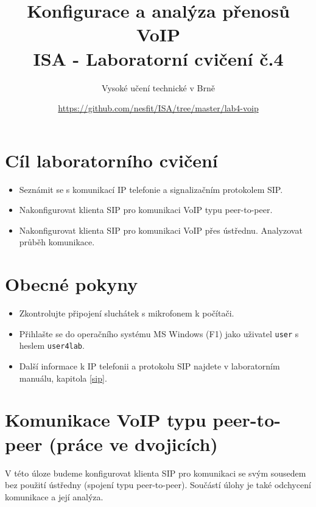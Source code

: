 \documentclass[a4paper,11pt]{article}
\title{Konfigurace a analýza přenosů VoIP\\
{\bf\large ISA - Laboratorní cvičení č.4}}
\author{Vysoké učení technické v Brně}
\date{\url{https://github.com/nesfit/ISA/tree/master/lab4-voip}}
\begin{document}
{\let\newpage\relax\maketitle}
\section*{Cíl laboratorního cvičení}
\begin{itemize}
  \item Seznámit se s komunikací IP telefonie a signalizačním protokolem SIP.
  \item Nakonfigurovat klienta SIP pro komunikaci VoIP typu peer-to-peer.
  \item Nakonfigurovat klienta SIP pro komunikaci VoIP přes ústřednu. Analyzovat průběh komunikace.
\end{itemize}

\section*{Obecné pokyny}
\begin{itemize}
  \item Zkontrolujte připojení sluchátek s mikrofonem k počítači. 
  \item Přihlašte se do operačního systému MS Windows (F1) jako uživatel {\tt user} s heslem {\tt user4lab}.
  \item Další informace k IP telefonii a protokolu SIP najdete v laboratorním manuálu, kapitola \ref{sip}. 
\end{itemize}

\section{Komunikace VoIP typu peer-to-peer (práce ve dvojicích)}
V této úloze budeme konfigurovat klienta SIP pro komunikaci se svým sousedem bez použití ústředny (spojení typu peer-to-peer). Součástí úlohy je také odchycení komunikace a její analýza. 
\end{document}
